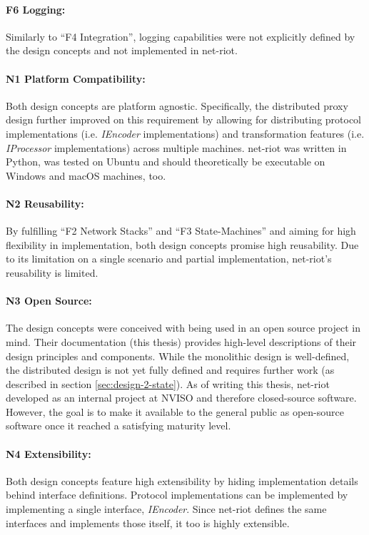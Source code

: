 \paragraph{F6 Logging:} Similarly to \enquote{F4 Integration}, logging capabilities were not explicitly defined by the design concepts and not implemented in net-riot.  
\paragraph{N1 Platform Compatibility:} Both design concepts are platform agnostic. Specifically, the distributed proxy design further improved on this requirement by allowing for distributing protocol implementations (i.e. \emph{IEncoder} implementations) and transformation features (i.e. \emph{IProcessor} implementations) across multiple machines. net-riot was written in Python, was tested on Ubuntu and should theoretically be executable on Windows and macOS machines, too.
\paragraph{N2 Reusability:} By fulfilling \enquote{F2 Network Stacks} and \enquote{F3 State-Machines} and aiming for high flexibility in implementation, both design concepts promise high reusability. Due to its limitation on a single scenario and partial implementation, net-riot's reusability is limited.
\paragraph{N3 Open Source:} The design concepts were conceived with being used in an open source project in mind. Their documentation (this thesis) provides high-level descriptions of their design principles and components. While the monolithic design is well-defined, the distributed design is not yet fully defined and requires further work (as described in section \ref{sec:design-2-state}). As of writing this thesis, net-riot developed as an internal project at NVISO and therefore closed-source software. However, the goal is to make it available to the general public as open-source software once it reached a satisfying maturity level.
\paragraph{N4 Extensibility:} Both design concepts feature high extensibility by hiding implementation details behind interface definitions. Protocol implementations can be implemented by implementing a single interface, \emph{IEncoder}. Since net-riot defines the same interfaces and implements those itself, it too is highly extensible. 
